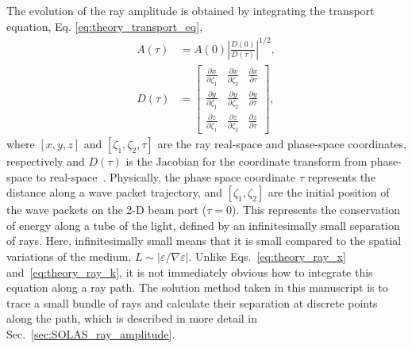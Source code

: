 The evolution of the ray amplitude is obtained by integrating the transport equation, Eq. \ref{eq:theory_transport_eq},
\begin{align}
    \label{eq:theory_ray_amp}
    A(\tau) &= A(0)\left| \frac{D(0)}{D(\tau)} \right|^{1/2}, \\
    D(\tau) &= 
    \begin{bmatrix}
        \frac{\partial x}{\partial \zeta_1} & \frac{\partial x}{\partial \zeta_2} & \frac{\partial x}{\partial \tau} \\
        \frac{\partial y}{\partial \zeta_1} & \frac{\partial y}{\partial \zeta_2} & \frac{\partial y}{\partial \tau} \\
        \frac{\partial z}{\partial \zeta_1} & \frac{\partial z}{\partial \zeta_2} & \frac{\partial z}{\partial \tau}
    \end{bmatrix},
\end{align}
where $[x,y,z]$ and $[\zeta_1,\zeta_2,\tau]$ are the ray real-space and phase-space coordinates, respectively and $D(\tau)$ is the Jacobian for the coordinate transform from phase-space to real-space~\cite{colaitis_inverse_2021}.
Physically, the phase space coordinate $\tau$ represents the distance along a wave packet trajectory, and $[\zeta_1,\zeta_2]$ are the initial position of the wave packets on the 2-D beam port ($\tau=0$).
This represents the conservation of energy along a tube of the light, defined by an infinitesimally small separation of rays.
Here, infinitesimally small means that it is small compared to the spatial variations of the medium, $L\sim|\varepsilon/\nabla \varepsilon|$.
Unlike Eqs.~\ref{eq:theory_ray_x} and~\ref{eq:theory_ray_k}, it is not immediately obvious how to integrate this equation along a ray path.
The solution method taken in this manuscript is to trace a small bundle of rays and calculate their separation at discrete points along the path, which is described in more detail in Sec.~\ref{sec:SOLAS_ray_amplitude}.

